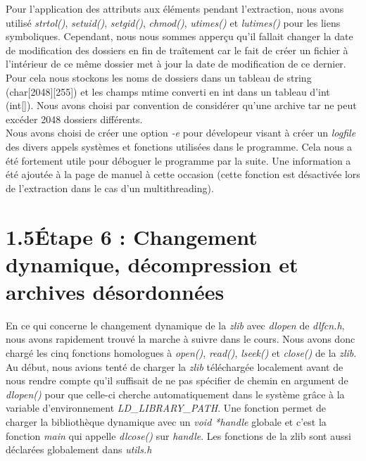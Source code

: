 \documentclass[12pt, a4paper]{report}
\begin{document}
\hspace{0.5cm}Pour l'application des attributs aux éléments pendant l'extraction, nous avons utilisé \textit{strtol()}, \textit{setuid()}, \textit{setgid()}, \textit{chmod()}, \textit{utimes()} et \textit{lutimes()} pour les liens symboliques. Cependant, nous nous sommes apperçu qu'il fallait changer la date de modification des dossiers en fin de traîtement car le fait de créer un fichier à l'intérieur de ce même dossier met à jour la date de modification de ce dernier. Pour cela nous stockons les noms de dossiers dans un tableau de string (char[2048][255]) et les champs mtime converti en int dans un tableau d'int (int[]). Nous avons choisi par convention de considérer qu'une archive tar ne peut excéder 2048 dossiers différents. \\

\hspace{0.5cm}Nous avons choisi de créer une option \textit{-e} pour dévelopeur visant à créer un \textit{logfile} des divers appels systèmes et fonctions utilisées dans le programme. Cela nous a été fortement utile pour déboguer le programme par la suite. Une information a été ajoutée à la page de manuel à cette occasion (cette fonction est désactivée lors de l'extraction dans le cas d'un multithreading).

\section*{\hspace{0.6cm}1.5\hspace{0.6cm}Étape 6 : Changement dynamique, décompression et archives désordonnées}
\hspace{1cm}En ce qui concerne le changement dynamique de la \textit{zlib} avec \textit{dlopen} de \textit{dlfcn.h}, nous avons rapidement trouvé la marche à suivre dans le cours. Nous avons donc chargé les cinq fonctions homologues à \textit{open()}, \textit{read()}, \textit{lseek()} et \textit{close()} de la \textit{zlib}. Au début, nous avions tenté de charger la \textit{zlib} téléchargée localement avant de nous rendre compte qu'il suffisait de ne pas spécifier de chemin en argument de \textit{dlopen()} pour que celle-ci cherche automatiquement dans le système grâce à la variable d'environnement \textit{LD\_LIBRARY\_PATH}. Une fonction permet de charger la bibliothèque dynamique avec un \textit{void *handle} globale et c'est la fonction \textit{main} qui appelle \textit{dlcose()} sur \textit{handle}. Les fonctions de la zlib sont aussi déclarées globalement dans \textit{utils.h}\\
\end{document}
